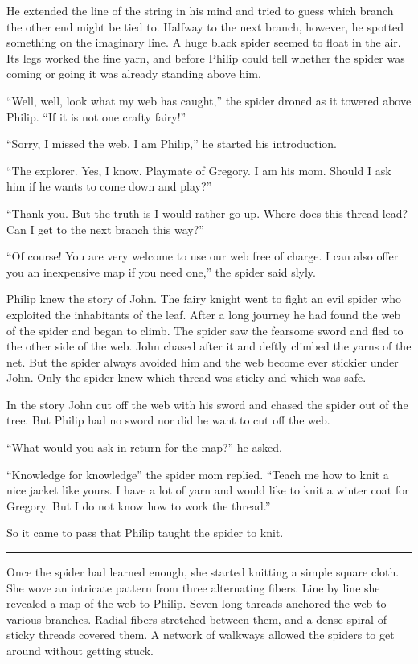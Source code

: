 \documentclass[10pt, draft]{memoir}
\renewcommand{\pfbreakdisplay}{\bigskip \ding{166} \bigskip}
\newcommand{\secbreak}{\fancybreak{\pfbreakdisplay}}
\begin{document}
He extended the line of the string in his mind and tried to guess which branch
the other end might be tied to. Halfway to the next branch, however, he spotted
something on the imaginary line. A huge black spider seemed to float in the
air. Its legs worked the fine yarn, and before Philip could tell whether the
spider was coming or going it was already standing above him.

``Well, well, look what my web has caught,'' the spider droned as it towered
above Philip. ``If it is not one crafty fairy!''

``Sorry, I missed the web. I am Philip,'' he started his introduction.

``The explorer. Yes, I know. Playmate of Gregory. I am his mom. Should I ask
him if he wants to come down and play?''

``Thank you. But the truth is I would rather go up. Where does this thread
lead? Can I get to the next branch this way?''

``Of course! You are very welcome to use our web free of charge. I can also
offer you an inexpensive map if you need one,'' the spider said slyly.

Philip knew the story of John. The fairy knight went to fight an evil spider
who exploited the inhabitants of the leaf. After a long journey he had found
the web of the spider and began to climb. The spider saw the fearsome sword and
fled to the other side of the web. John chased after it and deftly climbed the
yarns of the net. But the spider always avoided him and the web become ever
stickier under John. Only the spider knew which thread was sticky and which was
safe.

In the story John cut off the web with his sword and chased the spider out of
the tree. But Philip had no sword nor did he want to cut off the web.

``What would you ask in return for the map?'' he asked.

``Knowledge for knowledge'' the spider mom replied. ``Teach me how to knit a
nice jacket like yours. I have a lot of yarn and would like to knit a winter
coat for Gregory. But I do not know how to work the thread.''

So it came to pass that Philip taught the spider to knit.

\secbreak

Once the spider had learned enough, she started knitting a simple square cloth.
She wove an intricate pattern from three alternating fibers. Line by line she
revealed a map of the web to Philip. Seven long threads anchored the web to
various branches. Radial fibers stretched between them, and a dense spiral of
sticky threads covered them. A network of walkways allowed the spiders to get
around without getting stuck.
\end{document}
